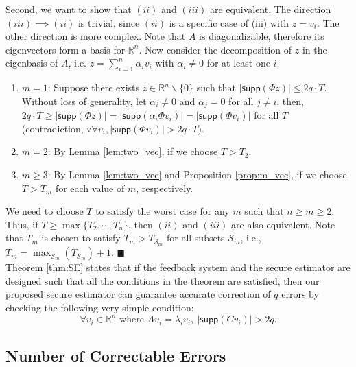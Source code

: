 \documentclass[../../thesis.tex]{subfiles}
\begin{document}
Second, we want to show that $(ii)$ and $(iii)$ are equivalent. The direction $(iii) \implies (ii)$ is trivial, since $(ii)$ is a specific case of (iii) with $z = v_i$. The other direction is more complex. Note that $A$ is diagonalizable, therefore its eigenvectors form a basis for $\mathbb{R}^n$. Now consider the decomposition of $z $ in the eigenbasis of $A$, i.e. $z = \sum_{i=1}^n \alpha_i v_i$ with $\alpha_i \neq 0$ for at least one $i$. 
\begin{enumerate}
\item $m=1$: Suppose there exists $z \in \mathbb{R}^n \backslash \{ 0\}$ such that $ \lvert \textsf{supp} (\Phi z) \rvert \le 2 q \cdot T$. Without loss of generality, let $\alpha_i \neq 0$ and $\alpha_j= 0$ for all $j \neq i$, then, $2 q \cdot T \ge \lvert \textsf{supp} (\Phi z) \rvert = \lvert \textsf{supp} (\alpha_i \Phi v_i) \rvert = \lvert \textsf{supp} (\Phi v_i) \rvert $ for all $T$ (contradiction, $\because \forall v_i, \lvert \textsf{supp} (\Phi v_i) \rvert  > 2 q \cdot T$). 
\item $m=2$: By Lemma \ref{lem:two_vec}, if we choose $T>T_2$.
\item $m\ge 3$: By Lemma \ref{lem:two_vec} and Proposition \ref{prop:m_vec}, if we choose $T>T_m$ for each value of $m$, respectively.
\end{enumerate}
We need to choose $T$ to satisfy the worst case for any $m$ such that $n \ge m \ge 2$. Thus, if $T \ge \max \{ T_2, \cdots, T_n \}$, then $(ii)$ and $(iii)$ are also equivalent. Note that $T_m$ is chosen to satisfy $T_m > T_{\mathcal{S}_m}$ for all subsets $\mathcal{S}_m$, i.e., $T_m = \max_{\mathcal{S}_m}( T_{\mathcal{S}_m})+1$.
\hfill$\blacksquare$\\



Theorem \ref{thm:SE} states that if the feedback system and the secure estimator are designed such that all the conditions in the theorem are satisfied, then our proposed secure estimator can guarantee accurate correction of $q$ errors by checking the following very simple condition:
\begin{equation}\label{eq:distinct}
\forall v_i \in \mathbb{R}^n \text{ where } Av_i =\lambda_i v_i, ~ \lvert \textsf{supp}(Cv_i) \rvert > 2q.  %
\end{equation}



\subsection{Number of Correctable Errors}\label{sec:max_q}
\end{document}
